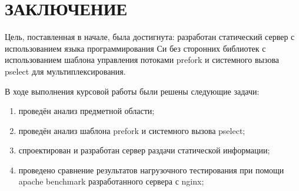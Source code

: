 \chapter*{ЗАКЛЮЧЕНИЕ}

Цель, поставленная в начале, была достигнута: разработан статический сервер с использованием языка программирования Си без сторонних библиотек с использованием шаблона управления потоками prefork и системного вызова pselect для мультиплексирования.

В ходе выполнения курсовой работы были решены следующие задачи:
\begin{enumerate}[label=\arabic*)]
	\item проведён анализ предметной области;
	\item проведён анализ шаблона prefork и системного вызова pselect;
	\item спроектирован и разработан сервер раздачи статической информации;
	\item проведено сравнение результатов нагрузочного тестирования при помощи apache benchmark разработанного сервера с nginx;
\end{enumerate}
